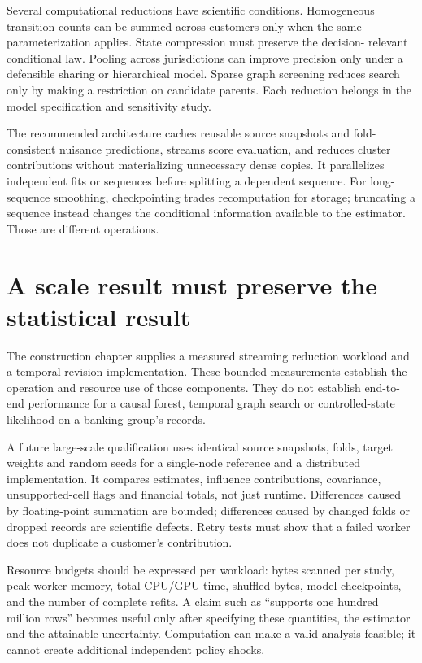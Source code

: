 Several computational reductions have scientific conditions. Homogeneous
transition counts can be summed across customers only when the same
parameterization applies. State compression must preserve the decision-
relevant conditional law. Pooling across jurisdictions can improve precision
only under a defensible sharing or hierarchical model. Sparse graph
screening reduces search only by making a restriction on candidate parents.
Each reduction belongs in the model specification and sensitivity study.

The recommended architecture caches reusable source snapshots and
fold-consistent nuisance predictions, streams score evaluation, and reduces
cluster contributions without materializing unnecessary dense copies.
It parallelizes independent fits or sequences before splitting a dependent
sequence. For long-sequence smoothing, checkpointing trades recomputation
for storage; truncating a sequence instead changes the conditional
information available to the estimator. Those are different operations.

\section{A scale result must preserve the statistical result}
The construction chapter supplies a measured streaming reduction workload
and a temporal-revision implementation. These bounded measurements establish
the operation and resource use of those components. They do not establish
end-to-end performance for a causal forest, temporal graph search or
controlled-state likelihood on a banking group's records.

A future large-scale qualification uses identical source snapshots, folds,
target weights and random seeds for a single-node reference and a distributed
implementation. It compares estimates, influence contributions, covariance,
unsupported-cell flags and financial totals, not just runtime. Differences
caused by floating-point summation are bounded; differences caused by changed
folds or dropped records are scientific defects. Retry tests must show that
a failed worker does not duplicate a customer's contribution.

Resource budgets should be expressed per workload: bytes scanned per study,
peak worker memory, total CPU/GPU time, shuffled bytes, model checkpoints,
and the number of complete refits. A claim such as ``supports one hundred
million rows'' becomes useful only after specifying these quantities, the
estimator and the attainable uncertainty. Computation can make a valid
analysis feasible; it cannot create additional independent policy shocks.
